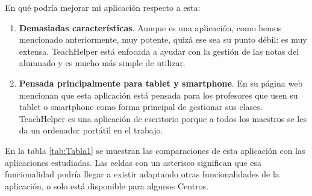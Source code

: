En qué podría mejorar mi aplicación respecto a esta:

\begin{enumerate}
	\item \textbf{Demasiadas características}. Aunque es una aplicación, como hemos mencionado anteriormente, muy potente, quizá ese sea su punto débil: es muy extensa. TeachHelper está enfocada a ayudar con la gestión de las notas del alumnado y es mucho más simple de utilizar.
	\item \textbf{Pensada principalmente para tablet y smartphone}. En su página web mencionan que esta aplicación está pensada para los profesores que usen su tablet o smartphone como forma principal de gestionar sus clases. TeachHelper es una aplicación de escritorio porque a todos los maestros se les da un ordenador portátil en el trabajo.

\end{enumerate}




En la tabla \ref{tab:Tabla1} se muestran las comparaciones de esta aplicación con las aplicaciones estudiadas. Las celdas con un asterisco significan que esa funcionalidad podría llegar a existir adaptando otras funcionalidades de la aplicación, o solo está disponible para algunos Centros.

